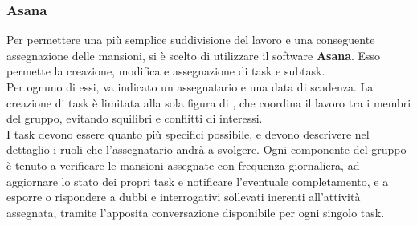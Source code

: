 		\subsubsection{Asana}
		Per permettere una più semplice suddivisione del lavoro e una conseguente assegnazione delle mansioni, si è scelto di utilizzare il software \textbf{Asana}. Esso permette la creazione, modifica e assegnazione di task e subtask.\\
		Per ognuno di essi, va indicato un assegnatario e una data di scadenza. La creazione di task è limitata alla sola figura di \textit{\RdP}, che coordina il lavoro tra i membri del gruppo, evitando squilibri e conflitti di interessi.\\
		I task devono essere quanto più specifici possibile, e devono descrivere nel dettaglio i ruoli che l'assegnatario andrà a svolgere. Ogni componente del gruppo è tenuto a verificare le mansioni assegnate con frequenza giornaliera, ad aggiornare lo stato dei propri task e notificare l'eventuale completamento, e a esporre o rispondere a dubbi e interrogativi sollevati inerenti all'attività assegnata, tramite l'apposita conversazione disponibile per ogni singolo task.
		
		